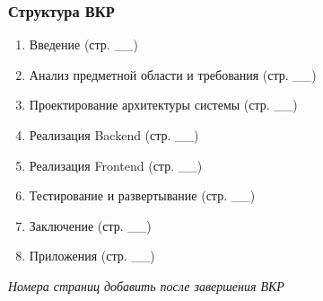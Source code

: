 \documentclass[aspectratio=43,11pt]{beamer}
\begin{document}
\begin{frame}
    \frametitle{Структура ВКР}
    
    \small
    
    \begin{enumerate}
        \item Введение (стр. \_\_)
        \item Анализ предметной области и требования (стр. \_\_)
        \item Проектирование архитектуры системы (стр. \_\_)
        \item Реализация Backend (стр. \_\_)
        \item Реализация Frontend (стр. \_\_)
        \item Тестирование и развертывание (стр. \_\_)
        \item Заключение (стр. \_\_)
        \item Приложения (стр. \_\_)
    \end{enumerate}
    
    \bigskip
    
    \small \textit{Номера страниц добавить после завершения ВКР}
\end{frame}
\end{document}
